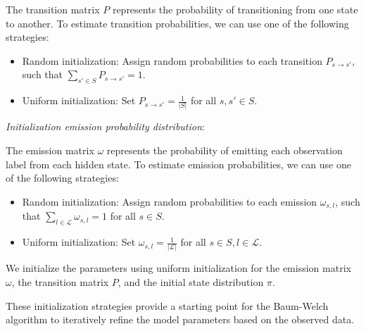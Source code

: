 The transition matrix $P$ represents the probability of transitioning from one state to another. 
To estimate transition probabilities, we can use one of the following strategies:
\begin{itemize}
    \item Random initialization: Assign random probabilities to each transition $P_{s \rightarrow s'}$, such that $\sum_{s' \in S} P_{s \rightarrow s'} = 1$.
    \item Uniform initialization: Set $P_{s \rightarrow s'} = \frac{1}{|S|}$ for all $s, s' \in S$.
\end{itemize}

\textit{Initialization emission probability distribution}:

The emission matrix $\omega$ represents the probability of emitting each observation label from each hidden state. 
To estimate emission probabilities, we can use one of the following strategies:
\begin{itemize}
    \item Random initialization: Assign random probabilities to each emission $\omega_{s, l}$, such that $\sum_{l \in \mathcal{L}} \omega_{s, l} = 1$ for all $s \in S$.
    \item Uniform initialization: Set $\omega_{s, l} = \frac{1}{|\mathcal{L}|}$ for all $s \in S, l \in \mathcal{L}$.
\end{itemize}

We initialize the parameters using uniform initialization for the emission matrix $\omega$, the transition matrix $P$, and the initial state distribution $\pi$.

These initialization strategies provide a starting point for the Baum-Welch algorithm to iteratively refine the model parameters based on the observed data.

